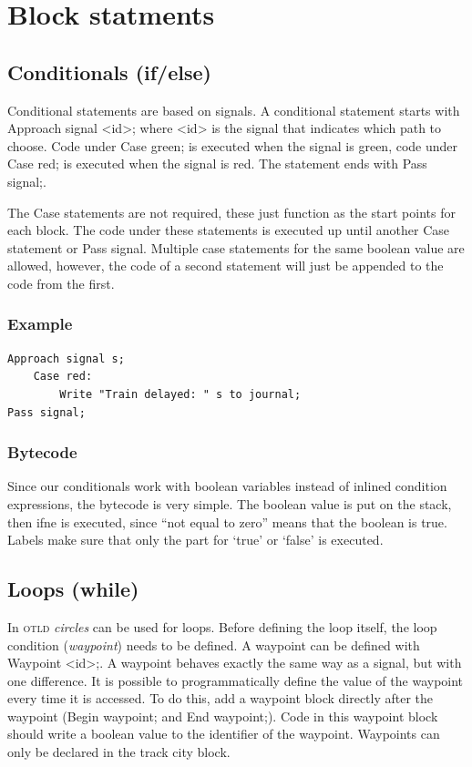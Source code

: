 \documentclass[10pt,a4paper]{article}
\newcommand{\code}[1]{{\ttfamily\small #1}}
\newcommand{\shortname}{\textsc{otld} }
\begin{document}
\section{Block statments}

\subsection{Conditionals (if/else)}

Conditional statements are based on signals. A conditional statement starts with \code{Approach signal <id>;} where \code{<id>} is the signal that indicates which path to choose. Code under \code{Case green;} is executed when the signal is green, code under \code{Case red;} is executed when the signal is red. The statement ends with \code{Pass signal;}.

The \code{Case} statements are not required, these just function as the start points for each block. The code under these statements is executed up until another \code{Case} statement or \code{Pass signal}. Multiple case statements for the same boolean value are allowed, however, the code of a second statement will just be appended to the code from the first.

\subsubsection*{Example}

\begin{lstlisting}
Approach signal s;
	Case red:
		Write "Train delayed: " s to journal;
Pass signal;
\end{lstlisting}

\subsubsection*{Bytecode}

Since our conditionals work with boolean variables instead of inlined condition expressions, the bytecode is very simple. The boolean value is put on the stack, then \code{ifne} is executed, since ``not equal to zero'' means that the boolean is true. Labels make sure that only the part for `true' or `false' is executed.

\subsection{Loops (while)}

In \shortname \emph{circles} can be used for loops. Before defining the loop itself, the loop condition (\emph{waypoint}) needs to be defined. A waypoint can be defined with \code{Waypoint <id>;}. A waypoint behaves exactly the same way as a signal, but with one difference. It is possible to programmatically define the value of the waypoint every time it is accessed. To do this, add a waypoint block directly after the waypoint (\code{Begin waypoint;} and \code{End waypoint;}). Code in this waypoint block should write a boolean value to the identifier of the waypoint. Waypoints can only be declared in the \code{track} city block.
\end{document}
